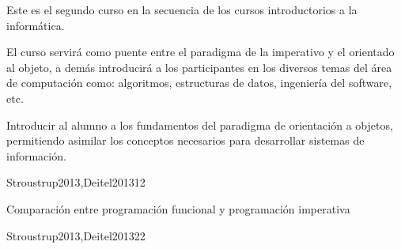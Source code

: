 \begin{syllabus}


\begin{justification}
Este es el segundo curso en la secuencia de los cursos introductorios a la informática.

El curso servirá como puente entre el paradigma de la imperativo y el orientado al objeto, a demás introducirá a los participantes en los diversos temas del área de computación como: algoritmos, estructuras de datos, ingeniería del software, etc.
\end{justification}

\begin{goals}
\item Introducir al alumno a los fundamentos del paradigma de
      orientación a objetos, permitiendo asimilar los conceptos
      necesarios para desarrollar  sistemas de información.
\end{goals}

\begin{outcomes}
\end{outcomes}

\begin{unit}{\PLOverviewDef}{Stroustrup2013,Deitel2013}{1}{2}
   \begin{topics}
      \item \PLOverviewTopicBrief
      \item Comparación entre programación funcional y programación imperativa
      \item \PLOverviewTopicHistory
   \end{topics}

   \begin{learningoutcomes}
      \item \PLOverviewObjONE
      \item \PLOverviewObjTWO
      \item \PLOverviewObjTHREE
   \end{learningoutcomes}
\end{unit}

\begin{unit}{\PLVirtualMachinesDef}{Stroustrup2013,Deitel2013}{2}{2}
   \begin{topics}
      \item \PLVirtualMachinesTopicETheconcept%
      \item \PLVirtualMachinesTopicHierarchy%
      \item \PLVirtualMachinesTopicIntermediate%
   \end{topics}


\end{unit}
\end{syllabus}
